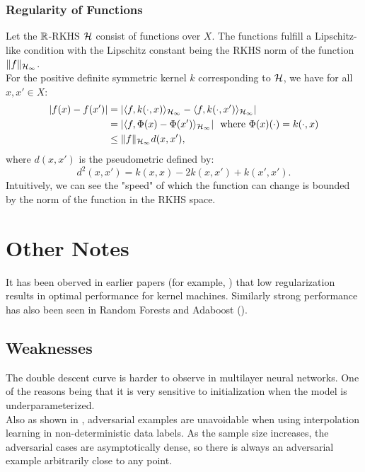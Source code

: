 \documentclass[twoside]{memoir}
\begin{document}
\subsection{Regularity of Functions}
Let the $\mathbb{R}$-RKHS $\mathcal{H}$ consist of functions over $X$. The functions fulfill a Lipschitz-like condition with the Lipschitz constant being the RKHS norm of the function $\lVert f\rVert_{\mathcal{H}_\infty}$.\\
For the positive definite symmetric kernel $k$ corresponding to $\mathcal{H}$, we have for all $x, x' \in X$:
\begin{equation*}
\begin{split}
|f(x) - f(x')| &= |\langle f, k(\cdot, x)\rangle_{\mathcal{H}_\infty} - \langle f, k(\cdot, x')\rangle_{\mathcal{H}_\infty}| \\
&= |\langle f, \Phi(x) - \Phi(x')\rangle_{\mathcal{H}_\infty}| ~ \text{ where }  \Phi(x)(\cdot) = k(\cdot, x)\\
&\leq \lVert f\rVert_{\mathcal{H}_\infty} d(x, x'),
\end{split}
\end{equation*}
where $d(x, x')$ is the pseudometric defined by:
\[ d^2(x, x') = k(x, x) - 2k(x, x') + k(x', x'). \]
Intuitively, we can see the "speed" of which the function can change is bounded by the norm of the function in the RKHS space.

\chapter{Other Notes}
It has been oberved in earlier papers (for example, \cite{Shalev_Shwartz_2010}) that low regularization results in optimal performance for kernel machines. Similarly strong performance has also been seen in Random Forests and Adaboost (\cite{Random_Forests_2017}).

\section{Weaknesses}
The double descent curve is harder to observe in multilayer neural networks. One of the reasons being that it is very sensitive to initialization when the model is underparameterized.\\
Also as shown in \cite{Belkin_Overfitting}, adversarial examples are unavoidable when using interpolation learning in non-deterministic data labels. As the sample size increases, the adversarial cases are asymptotically dense, so there is always an adversarial example arbitrarily close to any point.


\appendix
\end{document}
